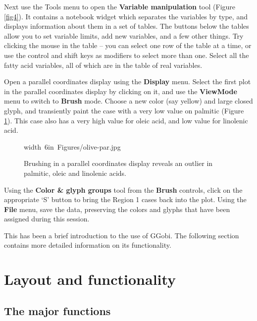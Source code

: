 \documentclass[11pt]{article}
\begin{document}
Next use the Tools menu to open the {\bf Variable manipulation} tool
(Figure \ref{fig4}).  It contains a notebook widget which separates
the variables by type, and displays information about them in a set
of tables.  The buttons below the tables allow you to set variable
limits, add new variables, and a few other things.  Try clicking the
mouse in the table -- you can select one row of the table at a time,
or use the control and shift keys as modifiers to select more than one.
Select all the fatty acid variables, all of which are in the table
of real variables.

Open a parallel coordinates display using the {\bf Display} menu.
Select the first plot in the parallel coordinates display by
clicking on it, and use the {\bf ViewMode} menu to switch to {\bf
Brush} mode. Choose a new color (say yellow) and large closed glyph,
and transiently paint the case with a very low value on palmitic
(Figure \ref{fig7}). This case also has a very high value for oleic
acid, and low value for linolenic acid.

\begin{figure}[htp]
\hbox{\pdfimage width 6in {Figures/olive-par.jpg}}
\caption{Brushing in a parallel coordinates display reveals an outlier in 
palmitic, oleic and linolenic acids.}
\label{fig7}
\end{figure}

Using the {\bf Color \& glyph groups} tool from the {\bf Brush}
controls, click on the appropriate `S' button to bring the Region 1
cases back into the plot.  Using the {\bf File} menu, save the data,
preserving the colors and glyphs that have been assigned during this
session.

This has been a brief introduction to the use of GGobi. The following
section contains more detailed information on its functionality.

\section{Layout and functionality}

\subsection{The major functions}
\end{document}

